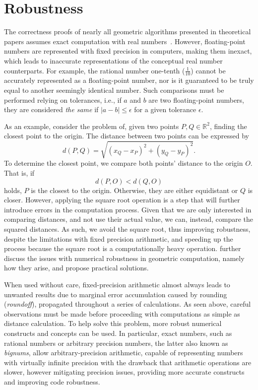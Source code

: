 \section{Robustness}%
\label{sec:related.robustness}

The correctness proofs of nearly all geometric algorithms presented in
theoretical papers assumes exact computation with real
numbers~\cite{cgal:bfghhkps-lgk23-18b}.  However, floating-point numbers are
represented with fixed precision in computers, making them inexact, which leads
to inaccurate representations of the conceptual real number counterparts.  For
example, the rational number one-tenth ($\frac{1}{10}$) cannot be accurately
represented as a floating-point number, nor is it guaranteed to be truly equal
to another seemingly identical number.  Such comparisons must be performed
relying on tolerances, i.e., if $a$ and $b$ are two floating-point numbers, they
are considered \textit{the same} if $|a - b| \le \epsilon$ for a given tolerance
$\epsilon$.

As an example, consider the problem of, given two points $P,Q \in \mathbb{R}^2$,
finding the closest point to the origin.  The distance between two points can be
expressed by
%
\begin{equation}
  d(P, Q) = \sqrt{(x_Q - x_P)^2 + (y_Q - y_P)^2}.
\end{equation}
%
To determine the closest point, we compare both points' distance to the origin
$O$.  That is, if
%
\[
  d(P, O) < d(Q, O)
\]
%
holds, $P$ is the closest to the origin.  Otherwise, they are either equidistant
or $Q$ is closer.  However, applying the square root operation is a step that
will further introduce errors in the computation process.  Given that we are
only interested in comparing distances, and not use their actual value, we can,
instead, compare the squared distances.  As such, we avoid the square root, thus
improving robustness, despite the limitations with fixed precision arithmetic,
and speeding up the process because the square root is a computationally heavy
operation.   further discuss the issues with numerical
robustness in geometric computation, namely how they arise, and propose
practical solutions.

When used without care, fixed-precision arithmetic almost always leads to
unwanted results due to marginal error accumulation caused by rounding
(\textit{roundoff}), propagated throughout a series of calculations.  As seen
above, careful observations must be made before proceeding with computations as
simple as distance calculation.  To help solve this problem, more robust
numerical constructs and concepts can be used.  In particular, exact numbers,
such as rational numbers or arbitrary precision numbers, the latter also known
as \textit{bignums}, allow arbitrary-precision arithmetic, capable of
representing numbers with virtually infinite precision with the drawback that
arithmetic operations are slower, however mitigating precision issues, providing
more accurate constructs and improving code robustness.

